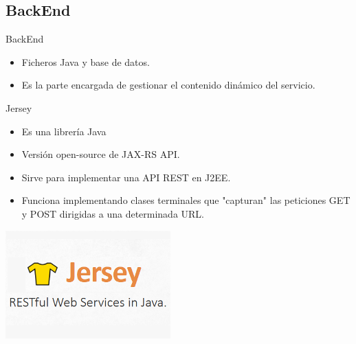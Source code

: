 \documentclass{beamer}
\begin{document}
        \subsection{BackEnd}

            \begin{frame}{BackEnd}
                \begin{itemize}
                    \item Ficheros Java y base de datos.
                    \item Es la parte  encargada de gestionar el contenido dinámico del servicio.
                \end{itemize}
            \end{frame}

            \begin{frame}{Jersey}
                \begin{minipage}{0.70\textwidth}
                    \begin{itemize}
                        \item Es una librería Java
                        \item Versión open-source de JAX-RS API.
                        \item Sirve para implementar una API REST en J2EE.
                        \item Funciona implementando clases terminales que "capturan" las peticiones GET y POST dirigidas a una determinada URL.
                    \end{itemize}
                \end{minipage}
                \begin{minipage}{0.25\textwidth}
                    \includegraphics[width=\textwidth]{res/logo-jersey}
                \end{minipage}
            \end{frame}
\end{document}
